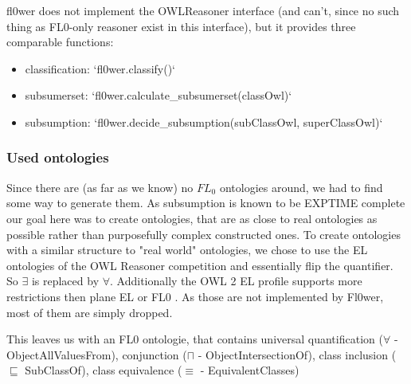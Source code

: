 \documentclass[a4paper]{article}
\begin{document}
fl0wer does not implement the OWLReasoner interface (and can't, since no such thing as FL0-only reasoner exist in this interface), but
it provides three comparable functions:
\begin{itemize}
	\item classification: `fl0wer.classify()`
	\item subsumerset:    `fl0wer.calculate\_subsumerset(classOwl)`
	\item subsumption:    `fl0wer.decide\_subsumption(subClassOwl, superClassOwl)`
\end{itemize}

\subsubsection{Used ontologies}

Since there are (as far as we know) no $FL_0$ ontologies around, we had to find some way to generate them. As subsumption is known to be EXPTIME complete  our goal here was to create ontologies, that are as close to real ontologies as possible rather than purposefully complex constructed ones. To create ontologies with a similar structure to "real world" ontologies, we chose to use the EL ontologies of the OWL Reasoner competition \cite{parsia2017owl} and essentially flip the quantifier. So $\exists$ is replaced by $\forall$. Additionally the OWL 2 EL profile  supports more restrictions then plane EL or FL0 . As those are not implemented by Fl0wer, most of them are simply dropped. 


This leaves us with an FL0 ontologie, that contains universal quantification ($\forall$ - ObjectAllValuesFrom), conjunction ($\sqcap$ - ObjectIntersectionOf), class inclusion ($\sqsubseteq$ SubClassOf), class equivalence ($\equiv$ - EquivalentClasses) 
\end{document}
